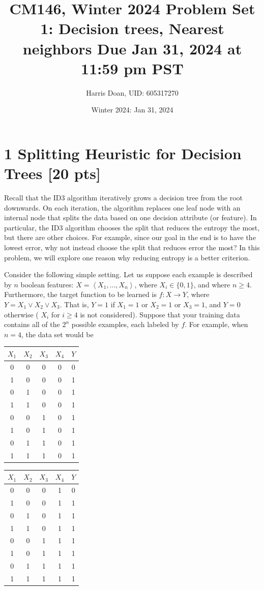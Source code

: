 \documentclass[10pt]{article}
\title{CM146, Winter 2024 
 Problem Set 1: Decision trees, Nearest neighbors 
 Due Jan 31, 2024 at 11:59 pm PST }
\author{Harris Doan, UID: 605317270}
\date{Winter 2024: Jan 31, 2024}
\begin{document}
\maketitle
\section*{1 Splitting Heuristic for Decision Trees [20 pts]}
Recall that the ID3 algorithm iteratively grows a decision tree from the root downwards. On each iteration, the algorithm replaces one leaf node with an internal node that splits the data based on one decision attribute (or feature). In particular, the ID3 algorithm chooses the split that reduces the entropy the most, but there are other choices. For example, since our goal in the end is to have the lowest error, why not instead choose the split that reduces error the most? In this problem, we will explore one reason why reducing entropy is a better criterion.

Consider the following simple setting. Let us suppose each example is described by $n$ boolean features: $X=\left\langle X_{1}, \ldots, X_{n}\right\rangle$, where $X_{i} \in\{0,1\}$, and where $n \geq 4$. Furthermore, the target function to be learned is $f: X \rightarrow Y$, where $Y=X_{1} \vee X_{2} \vee X_{3}$. That is, $Y=1$ if $X_{1}=1$ or $X_{2}=1$ or $X_{3}=1$, and $Y=0$ otherwise ( $X_{i}$ for $i \geq 4$ is not considered). Suppose that your training data contains all of the $2^{n}$ possible examples, each labeled by $f$. For example, when $n=4$, the data set would be

\begin{center}
\begin{tabular}{cccc|c}
$X_{1}$ & $X_{2}$ & $X_{3}$ & $X_{4}$ & $Y$ \\
\hline
0 & 0 & 0 & 0 & 0 \\
1 & 0 & 0 & 0 & 1 \\
0 & 1 & 0 & 0 & 1 \\
1 & 1 & 0 & 0 & 1 \\
0 & 0 & 1 & 0 & 1 \\
1 & 0 & 1 & 0 & 1 \\
0 & 1 & 1 & 0 & 1 \\
1 & 1 & 1 & 0 & 1 \\
\end{tabular}
\end{center}

\begin{center}
\begin{tabular}{cccc|c}
$X_{1}$ & $X_{2}$ & $X_{3}$ & $X_{4}$ & $Y$ \\
\hline
0 & 0 & 0 & 1 & 0 \\
1 & 0 & 0 & 1 & 1 \\
0 & 1 & 0 & 1 & 1 \\
1 & 1 & 0 & 1 & 1 \\
0 & 0 & 1 & 1 & 1 \\
1 & 0 & 1 & 1 & 1 \\
0 & 1 & 1 & 1 & 1 \\
1 & 1 & 1 & 1 & 1 \\
\end{tabular}
\end{center}
\end{document}
